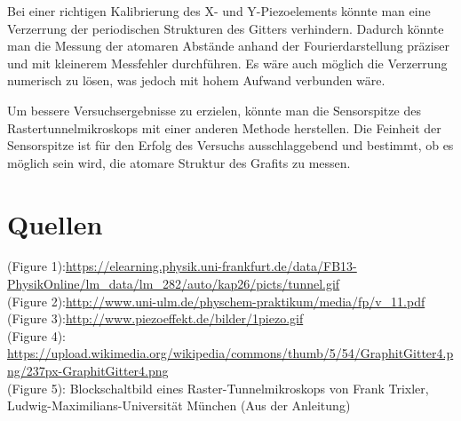 \documentclass[10pt,a4paper]{article}
\begin{document}
Bei einer richtigen Kalibrierung des X- und Y-Piezoelements könnte man eine Verzerrung der periodischen Strukturen des Gitters verhindern. Dadurch könnte man die Messung der atomaren Abstände anhand der Fourierdarstellung präziser und mit kleinerem Messfehler durchführen. Es wäre auch möglich die Verzerrung numerisch zu lösen, was jedoch mit hohem Aufwand verbunden wäre.

Um bessere Versuchsergebnisse zu erzielen, könnte man die Sensorspitze des Rastertunnelmikroskops mit einer anderen Methode herstellen. Die Feinheit der Sensorspitze ist für den Erfolg des Versuchs ausschlaggebend und bestimmt, ob es möglich sein wird, die atomare Struktur des Grafits zu messen.




\section{Quellen}
(Figure 1):\url{https://elearning.physik.uni-frankfurt.de/data/FB13-PhysikOnline/lm_data/lm_282/auto/kap26/picts/tunnel.gif}\\
(Figure 2):\url{http://www.uni-ulm.de/physchem-praktikum/media/fp/v_11.pdf}\\
(Figure 3):\url{http://www.piezoeffekt.de/bilder/1piezo.gif}\\
(Figure 4): \url{https://upload.wikimedia.org/wikipedia/commons/thumb/5/54/GraphitGitter4.png/237px-GraphitGitter4.png}\\
(Figure 5): Blockschaltbild eines Raster-Tunnelmikroskops von Frank Trixler, Ludwig-Maximilians-Universität München (Aus der Anleitung)
\end{document}
